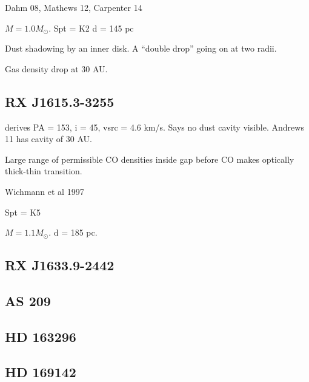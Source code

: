 \documentclass[iop,floatfix,numberedappendix,twocolappendix]{emulateapj}
\begin{document}
Dahm 08, Mathews 12, Carpenter 14

$M = 1.0 M_\odot$.
Spt = K2
d = 145 pc

Dust shadowing by an inner disk. A ``double drop'' going on at two radii.

Gas density drop at 30 AU.

\subsection{RX J1615.3-3255}
\citep{vandermarel15} derives PA = 153, i = 45, vsrc = 4.6 km/s. Says no dust cavity visible. Andrews 11 has cavity of 30 AU.

Large range of permissible CO densities inside gap before CO makes optically thick-thin transition.

\citep{andrews11}
Wichmann et al 1997

Spt = K5

$M = 1.1 M_\odot$.
d = 185 pc.

\subsection{RX J1633.9-2442}

\subsection{AS 209}

\subsection{HD 163296}

\subsection{HD 169142}
\end{document}
